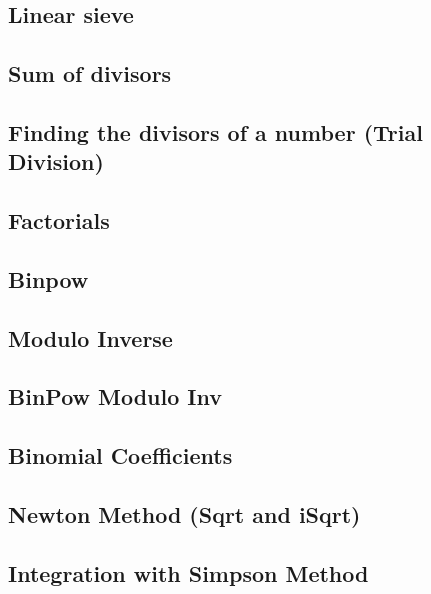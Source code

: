 \documentclass[10pt]{article}
\begin{document}
\begin{multicols*}{2}
\subsection{Linear sieve}


\subsection{Sum of divisors}


\subsection{Finding the divisors of a number (Trial Division)}


\subsection{Factorials}


\subsection{Binpow}

\subsection{Modulo Inverse}


\subsection{BinPow Modulo Inv}

\subsection{Binomial Coefficients}

\subsection{Newton Method (Sqrt and iSqrt)}

\subsection{Integration with Simpson Method}


\end{multicols*}
\end{document}
